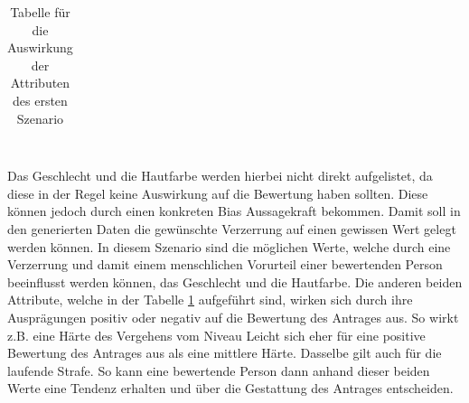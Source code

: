 \begin{onehalfspace}
\begin{table}[!h]
\begin{tabular}{|l|l|l|}
    \end{tabular}
\caption{Tabelle für die Auswirkung der Attributen des ersten Szenario}
\label{table:1}
\end{table}\\
Das Geschlecht und die Hautfarbe werden hierbei nicht direkt aufgelistet, da diese in der Regel keine Auswirkung auf die Bewertung haben sollten. Diese können jedoch durch einen konkreten Bias Aussagekraft bekommen. Damit soll in den generierten Daten die gewünschte Verzerrung auf einen gewissen Wert gelegt werden können. In diesem Szenario sind die möglichen Werte, welche durch eine Verzerrung und damit einem menschlichen Vorurteil einer bewertenden Person beeinflusst werden können, das Geschlecht und die Hautfarbe. Die anderen beiden Attribute, welche in der Tabelle \ref*{table:1} aufgeführt sind, wirken sich durch ihre Ausprägungen positiv oder negativ auf die Bewertung des Antrages aus. So wirkt z.B. eine Härte des Vergehens vom Niveau Leicht sich eher für eine positive Bewertung des Antrages aus als eine mittlere Härte. Dasselbe gilt auch für die laufende Strafe. So kann eine bewertende Person dann anhand dieser beiden Werte eine Tendenz erhalten und über die Gestattung des Antrages entscheiden.

\end{onehalfspace}
